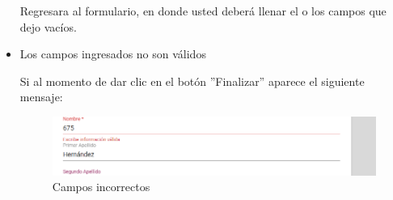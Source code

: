 \begin{itemize}
\begin{figure}[!hbtp]
                         \end{figure}
                           
                           Regresara  al formulario, en donde usted deberá llenar el o los campos que dejo vacíos. 
                        
                        
                        
                            
                        
                
                        \item Los campos ingresados no son válidos
                        
                            Si al momento de dar clic en el botón ''Finalizar'' aparece el siguiente mensaje:
                            \clearpage
                                \begin{figure}[!hbtp]
                            \centering
                            \includegraphics[width=0.4\linewidth]{images/SP1/MSG35}
                            \caption{Campos incorrectos}
                            \label{mensaje35}
                            

\end{figure}
\end{itemize}
